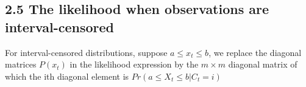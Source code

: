 \documentclass{article}
\begin{document}
\subsection*{2.5 The likelihood when observations are interval-censored}
For interval-censored distributions, suppose $a \leq x_t \leq b$, we replace the diagonal matrices $P(x_t)$ in the likelihood expression by the $m \times m$ diagonal matrix of which the ith diagonal element is $Pr(a \leq X_t \leq b | C_t = i)$
\end{document}
